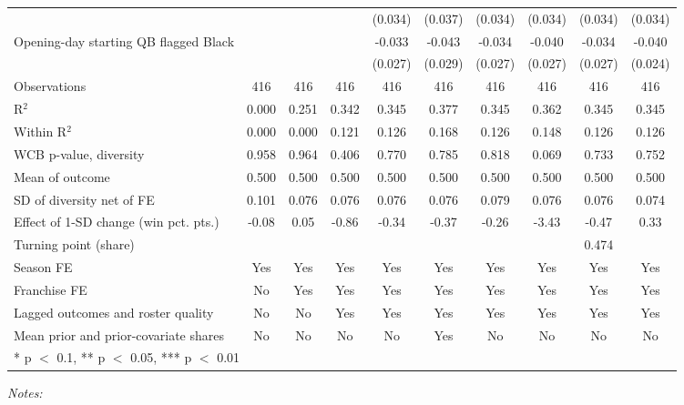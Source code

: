 \begin{table}[!h]
{\begin{threeparttable}
\begin{tabular}[t]{lccccccccc}
 &  &  &  & (0.034) & (0.037) & (0.034) & (0.034) & (0.034) & (0.034)\\
Opening-day starting QB flagged Black &  &  &  & -0.033 & -0.043 & -0.034 & -0.040 & -0.034 & -0.040\\
 &  &  &  & (0.027) & (0.029) & (0.027) & (0.027) & (0.027) & (0.024)\\
\midrule
Observations & 416 & 416 & 416 & 416 & 416 & 416 & 416 & 416 & 416\\
R$^2$ & 0.000 & 0.251 & 0.342 & 0.345 & 0.377 & 0.345 & 0.362 & 0.345 & 0.345\\
Within R$^2$ & 0.000 & 0.000 & 0.121 & 0.126 & 0.168 & 0.126 & 0.148 & 0.126 & 0.126\\
WCB p-value, diversity & 0.958 & 0.964 & 0.406 & 0.770 & 0.785 & 0.818 & 0.069 & 0.733 & 0.752\\
Mean of outcome & 0.500 & 0.500 & 0.500 & 0.500 & 0.500 & 0.500 & 0.500 & 0.500 & 0.500\\
SD of diversity net of FE & 0.101 & 0.076 & 0.076 & 0.076 & 0.076 & 0.079 & 0.076 & 0.076 & 0.074\\
Effect of 1-SD change (win pct. pts.) & -0.08 & 0.05 & -0.86 & -0.34 & -0.37 & -0.26 & -3.43 & -0.47 & 0.33\\
Turning point (share) &  &  &  &  &  &  &  & 0.474 & \\
Season FE & Yes & Yes & Yes & Yes & Yes & Yes & Yes & Yes & Yes\\
Franchise FE & No & Yes & Yes & Yes & Yes & Yes & Yes & Yes & Yes\\
Lagged outcomes and roster quality & No & No & Yes & Yes & Yes & Yes & Yes & Yes & Yes\\
Mean prior and prior-covariate shares & No & No & No & No & Yes & No & No & No & No\\
\bottomrule
\multicolumn{10}{l}{\rule{0pt}{1em}* p $<$ 0.1, ** p $<$ 0.05, *** p $<$ 0.01}\\
\end{tabular}
\begin{tablenotes}[para]
\item \textit{Notes:} 

\end{tablenotes}
\end{threeparttable}}
\end{table}
